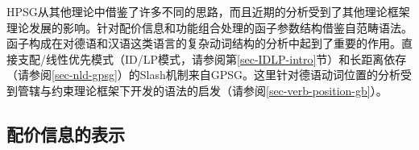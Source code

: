 HPSG从其他理论中借鉴了许多不同的思路，而且近期的分析受到了其他理论框架理论发展的影响。针对配价信息和功能组合处理的函子参数结构借鉴自范畴语法\indexcgc。函子构成在对德语和汉语这类语言的复杂动词结构的分析中起到了重要的作用。直接支配/线性优先模式（ID/LP模式，请参阅第\ref{sec-IDLP-intro}节）和长距离依存（请参阅\ref{sec-nld-gpsg}）的Slash机制来自GPSG\indexgpsgc。这里针对德语动词位置的分析受到管辖与约束理论\indexgbc 框架下开发的语法的启发（请参阅\ref{sec-verb-position-gb}）。

\subsection{配价信息的表示}


